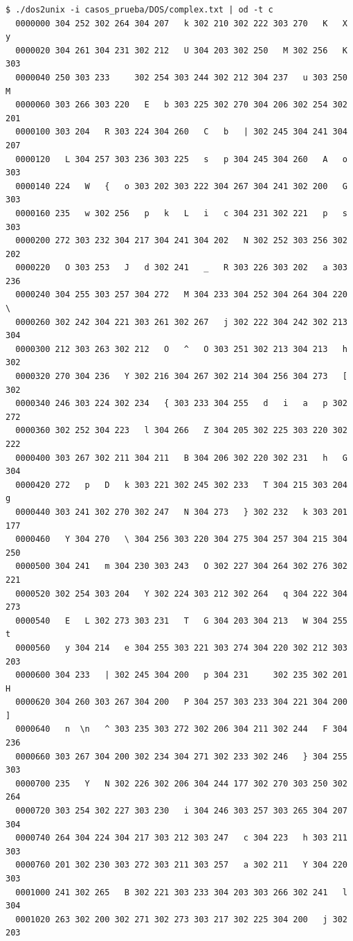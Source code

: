 \documentclass[a4paper,10pt, spanish]{article}
\begin{document}
\begin{lstlisting}
$ ./dos2unix -i casos_prueba/DOS/complex.txt | od -t c
  0000000 304 252 302 264 304 207   k 302 210 302 222 303 270   K   X   y
  0000020 304 261 304 231 302 212   U 304 203 302 250   M 302 256   K 303
  0000040 250 303 233     302 254 303 244 302 212 304 237   u 303 250   M
  0000060 303 266 303 220   E   b 303 225 302 270 304 206 302 254 302 201
  0000100 303 204   R 303 224 304 260   C   b   | 302 245 304 241 304 207
  0000120   L 304 257 303 236 303 225   s   p 304 245 304 260   A   o 303
  0000140 224   W   {   o 303 202 303 222 304 267 304 241 302 200   G 303
  0000160 235   w 302 256   p   k   L   i   c 304 231 302 221   p   s 303
  0000200 272 303 232 304 217 304 241 304 202   N 302 252 303 256 302 202
  0000220   O 303 253   J   d 302 241   _   R 303 226 303 202   a 303 236
  0000240 304 255 303 257 304 272   M 304 233 304 252 304 264 304 220   \
  0000260 302 242 304 221 303 261 302 267   j 302 222 304 242 302 213 304
  0000300 212 303 263 302 212   O   ^   O 303 251 302 213 304 213   h 302
  0000320 270 304 236   Y 302 216 304 267 302 214 304 256 304 273   [ 302
  0000340 246 303 224 302 234   { 303 233 304 255   d   i   a   p 302 272
  0000360 302 252 304 223   l 304 266   Z 304 205 302 225 303 220 302 222
  0000400 303 267 302 211 304 211   B 304 206 302 220 302 231   h   G 304
  0000420 272   p   D   k 303 221 302 245 302 233   T 304 215 303 204   g
  0000440 303 241 302 270 302 247   N 304 273   } 302 232   k 303 201 177
  0000460   Y 304 270   \ 304 256 303 220 304 275 304 257 304 215 304 250
  0000500 304 241   m 304 230 303 243   O 302 227 304 264 302 276 302 221
  0000520 302 254 303 204   Y 302 224 303 212 302 264   q 304 222 304 273
  0000540   E   L 302 273 303 231   T   G 304 203 304 213   W 304 255   t
  0000560   y 304 214   e 304 255 303 221 303 274 304 220 302 212 303 203
  0000600 304 233   | 302 245 304 200   p 304 231     302 235 302 201   H
  0000620 304 260 303 267 304 200   P 304 257 303 233 304 221 304 200   ]
  0000640   n  \n   ^ 303 235 303 272 302 206 304 211 302 244   F 304 236
  0000660 303 267 304 200 302 234 304 271 302 233 302 246   } 304 255 303
  0000700 235   Y   N 302 226 302 206 304 244 177 302 270 303 250 302 264
  0000720 303 254 302 227 303 230   i 304 246 303 257 303 265 304 207 304
  0000740 264 304 224 304 217 303 212 303 247   c 304 223   h 303 211 303
  0000760 201 302 230 303 272 303 211 303 257   a 302 211   Y 304 220 303
  0001000 241 302 265   B 302 221 303 233 304 203 303 266 302 241   l 304
  0001020 263 302 200 302 271 302 273 303 217 302 225 304 200   j 302 203

\end{lstlisting}
\end{document}
